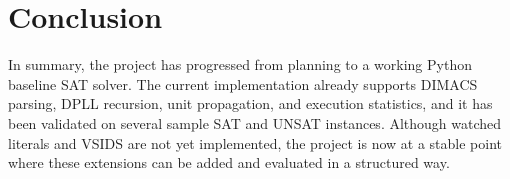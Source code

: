 \documentclass[11pt]{article}
\begin{document}
\section{Conclusion}

In summary, the project has progressed from planning to a working Python baseline SAT solver.
The current implementation already supports DIMACS parsing, DPLL recursion, unit propagation,
and execution statistics, and it has been validated on several sample SAT and UNSAT instances.
Although watched literals and VSIDS are not yet implemented, the project is now at a stable point
where these extensions can be added and evaluated in a structured way.
\end{document}
